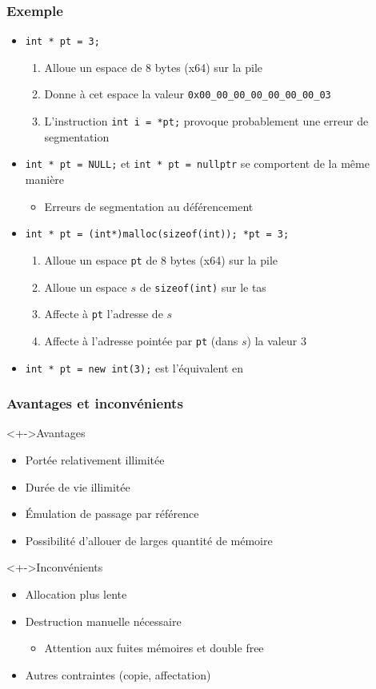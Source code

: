 \begin{frame}
\frametitle{Exemple}
\begin{itemize}[<+->]
\item \lstinline|int * pt = 3;|
	\begin{enumerate}
	\item Alloue un espace de 8 bytes (x64) sur la pile
	\item Donne à cet espace la valeur \texttt{0x00\_00\_00\_00\_00\_00\_00\_03}
	\item L'instruction \lstinline|int i = *pt;| provoque probablement une erreur de segmentation
	\end{enumerate}
\item \lstinline|int * pt = NULL;| et \lstinline|int * pt = nullptr| se comportent de la même manière
	\begin{itemize}
	\item Erreurs de segmentation au déférencement
	\end{itemize}
\item \lstinline|int * pt = (int*)malloc(sizeof(int)); *pt = 3;|
	\begin{enumerate}
	\item Alloue un espace \texttt{pt} de 8 bytes (x64) sur la pile
	\item Alloue un espace $s$ de \lstinline|sizeof(int)| sur le tas
	\item Affecte à \texttt{pt} l'adresse de $s$
	\item Affecte à l'adresse pointée par \texttt{pt} (dans $s$) la valeur $3$
	\end{enumerate}
\item \lstinline|int * pt = new int(3);| est l'équivalent en \cpp
\end{itemize}
\end{frame}

\begin{frame}
\frametitle{Avantages et inconvénients}
\begin{block}<+->{Avantages}
	\begin{itemize}[<+->]
	\item Portée relativement illimitée
	\item Durée de vie illimitée
	\item Émulation de passage par référence
	\item Possibilité d'allouer de larges quantité de mémoire
	\end{itemize}
\end{block}
\begin{alertblock}<+->{Inconvénients}
	\begin{itemize}[<+->]
	\item Allocation plus lente
	\item Destruction manuelle nécessaire
		\begin{itemize}
		\item Attention aux fuites mémoires et double free
		\end{itemize}
	\item Autres contraintes (copie, affectation)
	\end{itemize}
\end{alertblock}
\end{frame}

